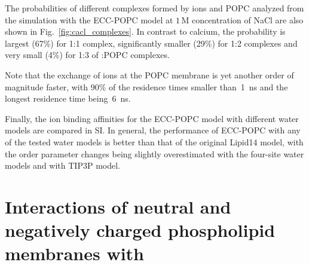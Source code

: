 The probabilities of different complexes formed by  ions and POPC 
analyzed from the simulation with the ECC-POPC model at $1\,$M concentration of NaCl are also  
shown in Fig.~\ref{fig:cacl_complexes}. In contrast to calcium, the 
probability is largest (67\%) for 1:1 complex, significantly smaller (29\%) 
for 1:2 complexes and very small (4\%) for 1:3 of :POPC complexes. 
 
Note that the exchange of  ions at the POPC membrane 
is yet another order of magnitude faster, with 90\% of the residence times smaller than~1~ns and the longest residence time being~6~ns. 
 
Finally, the ion binding affinities for the ECC-POPC model with different water models are compared in SI. In general, the performance of ECC-POPC with any of the tested water models is better than that of the original Lipid14 model, with the order parameter changes being slightly overestimated with the four-site water models and with TIP3P model. 
 





 
 


\section{Interactions of neutral and negatively charged phospholipid membranes with }



